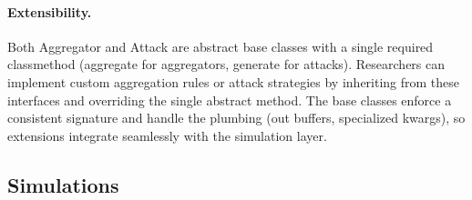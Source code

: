 \documentclass[twoside,11pt]{article}
\begin{document}
\paragraph{Extensibility.}
Both Aggregator and Attack are abstract base classes with a single required classmethod (aggregate for aggregators, generate for attacks). Researchers can implement custom aggregation rules or attack strategies by inheriting from these interfaces and overriding the single abstract method. The base classes enforce a consistent signature and handle the plumbing (out buffers, specialized kwargs), so extensions integrate seamlessly with the simulation layer.

\subsection{Simulations}
\end{document}
